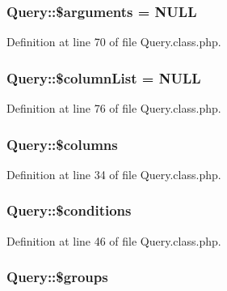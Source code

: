 \hypertarget{classQuery_a49166e3c5f5198e4b899c8ee47b6258a}{
\subsubsection[{\$arguments}]{\setlength{\rightskip}{0pt plus 5cm}Query\-::\$arguments = N\-U\-L\-L}}\label{classQuery_a49166e3c5f5198e4b899c8ee47b6258a}


Definition at line 70 of file Query.\-class.\-php.

\hypertarget{classQuery_a113bcdfdc3bf6acef684a06ae324334a}{
\subsubsection[{\$column\-List}]{\setlength{\rightskip}{0pt plus 5cm}Query\-::\$column\-List = N\-U\-L\-L}}\label{classQuery_a113bcdfdc3bf6acef684a06ae324334a}


Definition at line 76 of file Query.\-class.\-php.

\hypertarget{classQuery_a7cf97254cbd55fdbb9e149723498d9ba}{
\subsubsection[{\$columns}]{\setlength{\rightskip}{0pt plus 5cm}Query\-::\$columns}}\label{classQuery_a7cf97254cbd55fdbb9e149723498d9ba}


Definition at line 34 of file Query.\-class.\-php.

\hypertarget{classQuery_a5c71d786a82b2cc014968d2553b6bc9d}{
\subsubsection[{\$conditions}]{\setlength{\rightskip}{0pt plus 5cm}Query\-::\$conditions}}\label{classQuery_a5c71d786a82b2cc014968d2553b6bc9d}


Definition at line 46 of file Query.\-class.\-php.

\hypertarget{classQuery_a76992fbfae6d700e65dfde28911a2475}{
\subsubsection[{\$groups}]{\setlength{\rightskip}{0pt plus 5cm}Query\-::\$groups}}\label{classQuery_a76992fbfae6d700e65dfde28911a2475}


